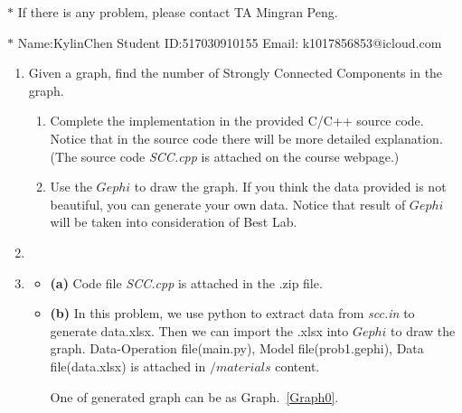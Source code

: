 \documentclass[12pt,a4paper]{article}
\makeatletter
\newtheorem*{solution}{Solution}
\theoremstyle{definition}
\renewenvironment{solution}[1][Solution] {\par\pushQED{\qed}\normalfont\topsep6\p@\@plus6\p@\relax\trivlist\item[\hskip\labelsep\bfseries#1\@addpunct{.}]\ignorespaces}{\popQED\endtrivlist\@endpefalse} \makeatother
\makeatother
\begin{document}
\noindent

\noindent{}


\begin{center}
\footnotesize{\color{red}$*$ If there is any problem, please contact TA Mingran Peng.}\par
\footnotesize{\color{blue}$*$ Name:KylinChen \quad Student ID:517030910155 \quad Email: k1017856853@icloud.com}
\end{center}
\begin{enumerate}
    
    \item
    Given a graph, find the number of Strongly Connected Components in the graph.
    \begin{enumerate}
        \item
         Complete the implementation in the provided C/C++ source code. Notice that in the source code there will be more detailed explanation.{\color{blue}(The source code \emph{SCC.cpp} is attached on the course webpage.)}\par
       \item
        Use the $Gephi$ to draw the graph. If you think the data provided is not beautiful, you can generate your own data. Notice that result of $Gephi$ will be taken into consideration of Best Lab.\par 
        
    \end{enumerate}
    \begin{solution}\item
        \renewcommand{\qedsymbol}{}
        \begin{itemize}
        \item \textbf{(a)} Code file \emph{SCC.cpp} is attached in the .zip file.
        \item \textbf{(b)} In this problem, we use python to extract data from \emph{scc.in} to generate data.xlsx. Then we can import the .xlsx into $Gephi$ to draw the graph. Data-Operation file(main.py), Model file(prob1.gephi), Data file(data.xlsx) is attached in $/materials$ content.\par
        One of generated graph can be as Graph.~\ref{Graph0}.


\end{itemize}
\end{solution}
\end{enumerate}
\end{document}
